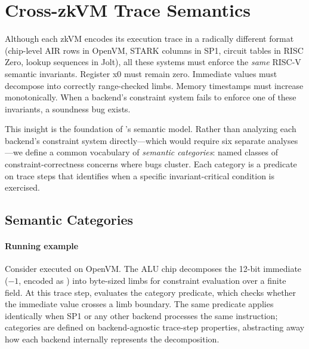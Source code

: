 \section{Cross-zkVM Trace Semantics}\label{sec:trace-ir}

Although each zkVM encodes its execution trace in a radically different format (chip-level AIR rows in OpenVM, STARK columns in SP1, circuit tables in RISC Zero, lookup sequences in Jolt), all these systems must enforce the \emph{same} RISC-V semantic invariants. Register x0 must remain zero. Immediate values must decompose into correctly range-checked limbs. Memory timestamps must increase monotonically. When a backend's constraint system fails to enforce one of these invariants, a soundness bug exists.

This insight is the foundation of \tool's semantic model. Rather than analyzing each backend's constraint system directly---which would require six separate analyses---we define a common vocabulary of \emph{semantic categories}: named classes of constraint-correctness concerns where bugs cluster. Each category is a predicate on trace steps that identifies when a specific invariant-critical condition is exercised.

\subsection{Semantic Categories}\label{sec:semantic-model}

\paragraph{Running example}
Consider  executed on OpenVM. The ALU chip decomposes the 12-bit immediate ($-1$, encoded as ) into byte-sized limbs for constraint evaluation over a finite field. At this trace step, \tool evaluates the  category predicate, which checks whether the immediate value crosses a limb boundary. The same predicate applies identically when SP1 or any other backend processes the same instruction; categories are defined on backend-agnostic trace-step properties, abstracting away how each backend internally represents the decomposition.

